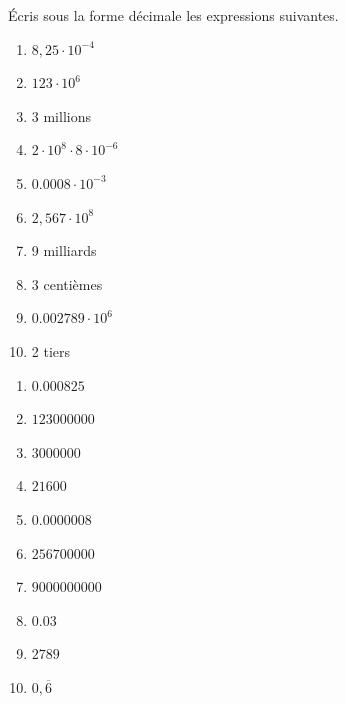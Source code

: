 \begin{exercise}
  Écris sous la forme décimale les expressions suivantes.
  \begin{enumerate}[cols=2]
    \item $8,25 \cdot 10^{- 4} $
    \item $123 \cdot 10^{6} $
    \item 3 millions
    \item $2 \cdot 10^{8} \cdot 8 \cdot 10^{- 6}$
    \item $\num{0,0008}\cdot 10^{- 3}$
    \item $2,567 \cdot 10^{8}$
    \item 9 milliards
    \item 3 centièmes
    \item $\num{0,002789} \cdot 10^{6} $
    \item 2 tiers
  \end{enumerate}
\end{exercise}
\begin{solution}
  \begin{enumerate}[cols=4]
    \item $\num{0,000825}$
    \item $\num{123000000}$
    \item $\num{3000000}$
    \item $2\num{1600}$
    \item $\num{0,0000008}$
    \item $\num{256700000}$
    \item $\num{9000000000}$
    \item $\num{0,03}$
    \item $\num{2789}$
    \item $0,\overline{6}$
  \end{enumerate}
\end{solution}

\newpage

